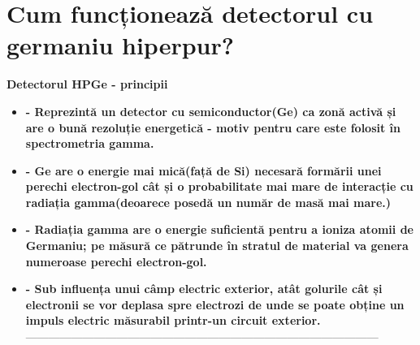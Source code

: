 \documentclass[10pt]{beamer}
\begin{document}
\section{\textbf{ Cum funcționează detectorul cu germaniu hiperpur?}}

\begin{frame}{\textbf{Detectorul HPGe - principii}}

\begin{itemize}

\vspace{-0.5cm}
\item[\ding{45}] \textbf{- Reprezintă un detector cu semiconductor(Ge) ca zonă activă și are o bună rezoluție energetică - motiv pentru care este folosit în spectrometria gamma.}\\
\item[\ding{45}] \textbf{- Ge are o energie mai mică(față de Si) necesară formării unei perechi electron-gol cât și o probabilitate mai mare de interacție cu radiația gamma(deoarece posedă un număr de masă mai mare.)}\\
\item[\ding{45}] \textbf{- Radiația gamma are o energie suficientă pentru a ioniza atomii de Germaniu; pe măsură ce pătrunde în stratul de material va genera numeroase perechi electron-gol.}\\
\item[\ding{45}] \textbf{- Sub influența unui câmp electric exterior, atât golurile cât și electronii se vor deplasa spre electrozi de unde se poate obține un impuls electric măsurabil printr-un circuit exterior.}
\\---------------------------------------------------------------------------------------------   
\end{itemize}

\end{frame}
\end{document}
